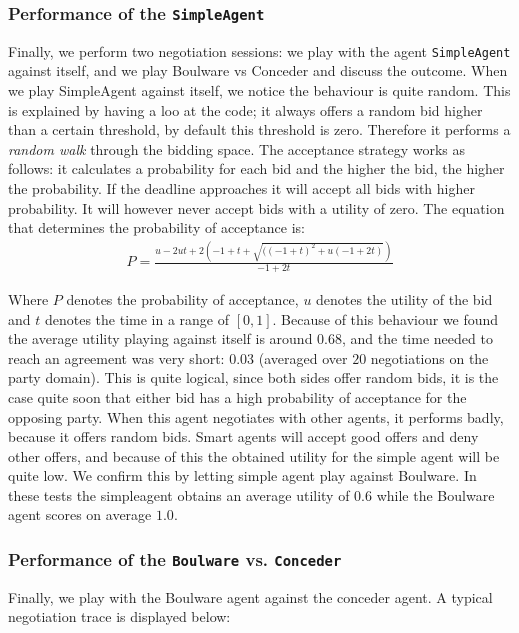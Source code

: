 \documentclass[a4paper,10pt]{article}
\begin{document}
\clearpage

\subsubsection{Performance of the \texttt{SimpleAgent}}

Finally, we perform two negotiation sessions: we play with the agent \texttt{SimpleAgent} against itself, and we play Boulware vs Conceder and discuss the outcome. When we play SimpleAgent against itself, we notice the behaviour is quite random. This is explained by having a loo at the code; it always offers a random bid higher than a certain threshold,
by default this threshold is zero. Therefore it performs a \emph{random walk} through the 
bidding space. The acceptance strategy works as follows: it calculates a probability for each bid and the higher the bid, the higher the probability. If the deadline approaches it will accept all bids with higher probability. It will however never accept bids with a utility of zero. The equation that determines the probability of acceptance is:
\begin{align}
P = \frac{u - 2ut + 2(-1 + t + \sqrt{((-1 + t)^2 + u(-1 + 2t)})}{-1 + 2t}
\end{align}

Where $P$ denotes the probability of acceptance, $u$ denotes the utility of the bid and $t$ denotes the time in a range of $[0, 1]$. Because of this behaviour we found the average utility playing against itself is around $0.68$, and the time needed to reach an agreement was very short: $0.03$ (averaged over $20$ negotiations on the party domain).
This is quite logical, since both sides offer random bids, it is the
case quite soon that either bid has a high probability of acceptance for the opposing party. When this agent negotiates with other agents, it performs badly, because
it offers random bids. Smart agents will accept good offers and deny other offers,
and because of this the obtained utility for the simple agent will be quite low.
We confirm this by letting simple agent play against Boulware. In these tests the simpleagent obtains an average utility of $0.6$ while the Boulware agent scores on average $1.0$. 

\subsubsection{Performance of the \texttt{Boulware} vs. \texttt{Conceder}}
Finally, we play with the Boulware agent against the conceder agent. A typical negotiation trace is displayed below: \\
\end{document}

